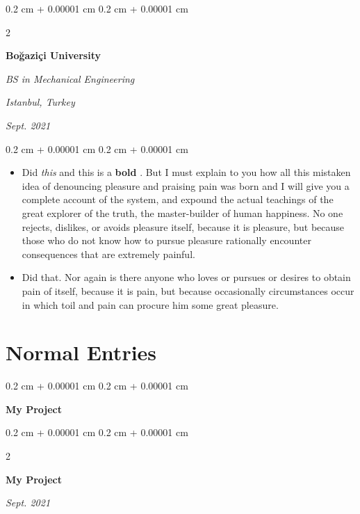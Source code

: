 \documentclass[10pt, letterpaper]{article}
\newenvironment{highlights}{
    \begin{itemize}[
        topsep=0.10 cm,
        parsep=0.10 cm,
        partopsep=0pt,
        itemsep=0pt,
        leftmargin=0.4 cm + 10pt
    ]
}{
    \end{itemize}
} %
\newenvironment{onecolentry}{
    \begin{adjustwidth}{
        0.2 cm + 0.00001 cm
    }{
        0.2 cm + 0.00001 cm
    }
}{
    \end{adjustwidth}
} %
\newenvironment{twocolentry}[2][]{
    \onecolentry
    \def\secondColumn{#2}
    \setcolumnwidth{\fill, 4.5 cm}
    \begin{paracol}{2}
}{
    \switchcolumn \raggedleft \secondColumn
    \end{paracol}
    \endonecolentry
} %
\let\hrefWithoutArrow\href
\renewcommand{\href}[2]{\hrefWithoutArrow{#1}{\mbox{\ifthenelse{\equal{#2}{}}{ }{#2 }\raisebox{.15ex}{\footnotesize \faExternalLink*}}}}
\begin{document}
        \vspace{0.2 cm-3px}

        \begin{twocolentry}{
        \textit{Istanbul, Turkey}    
            
        \textit{Sept. 2021}}
            \textbf{Boğaziçi University}

            \textit{BS in Mechanical Engineering}
        \end{twocolentry}

        \vspace{0.10 cm-3px}
        \begin{onecolentry}
            \begin{highlights}
                \item Did \textit{this} and this is a \textbf{bold} \href{https://example.com}{link}. But I must explain to you how all this mistaken idea of denouncing pleasure and praising pain was born and I will give you a complete account of the system, and expound the actual teachings of the great explorer of the truth, the master-builder of human happiness. No one rejects, dislikes, or avoids pleasure itself, because it is pleasure, but because those who do not know how to pursue pleasure rationally encounter consequences that are extremely painful.
                \item Did that. Nor again is there anyone who loves or pursues or desires to obtain pain of itself, because it is pain, but because occasionally circumstances occur in which toil and pain can procure him some great pleasure.
            \end{highlights}
        \end{onecolentry}



    
    \section{Normal Entries}



        
        \begin{onecolentry}
            \textbf{My Project}
        \end{onecolentry}



        \vspace{0.2 cm-3px}

        \begin{twocolentry}{
            
            
        \textit{Sept. 2021}}
            \textbf{My Project}
        \end{twocolentry}
\end{document}
